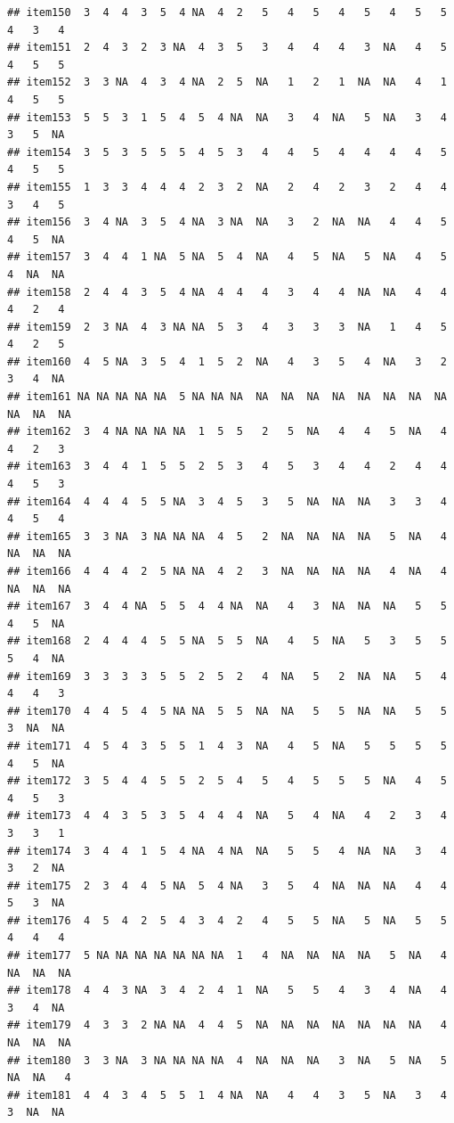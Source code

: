 \documentclass[
  man]{apa6}
\begin{document}
\begin{verbatim}
## item150  3  4  4  3  5  4 NA  4  2   5   4   5   4   5   4   5   5   4   3   4
## item151  2  4  3  2  3 NA  4  3  5   3   4   4   4   3  NA   4   5   4   5   5
## item152  3  3 NA  4  3  4 NA  2  5  NA   1   2   1  NA  NA   4   1   4   5   5
## item153  5  5  3  1  5  4  5  4 NA  NA   3   4  NA   5  NA   3   4   3   5  NA
## item154  3  5  3  5  5  5  4  5  3   4   4   5   4   4   4   4   5   4   5   5
## item155  1  3  3  4  4  4  2  3  2  NA   2   4   2   3   2   4   4   3   4   5
## item156  3  4 NA  3  5  4 NA  3 NA  NA   3   2  NA  NA   4   4   5   4   5  NA
## item157  3  4  4  1 NA  5 NA  5  4  NA   4   5  NA   5  NA   4   5   4  NA  NA
## item158  2  4  4  3  5  4 NA  4  4   4   3   4   4  NA  NA   4   4   4   2   4
## item159  2  3 NA  4  3 NA NA  5  3   4   3   3   3  NA   1   4   5   4   2   5
## item160  4  5 NA  3  5  4  1  5  2  NA   4   3   5   4  NA   3   2   3   4  NA
## item161 NA NA NA NA NA  5 NA NA NA  NA  NA  NA  NA  NA  NA  NA  NA  NA  NA  NA
## item162  3  4 NA NA NA NA  1  5  5   2   5  NA   4   4   5  NA   4   4   2   3
## item163  3  4  4  1  5  5  2  5  3   4   5   3   4   4   2   4   4   4   5   3
## item164  4  4  4  5  5 NA  3  4  5   3   5  NA  NA  NA   3   3   4   4   5   4
## item165  3  3 NA  3 NA NA NA  4  5   2  NA  NA  NA  NA   5  NA   4  NA  NA  NA
## item166  4  4  4  2  5 NA NA  4  2   3  NA  NA  NA  NA   4  NA   4  NA  NA  NA
## item167  3  4  4 NA  5  5  4  4 NA  NA   4   3  NA  NA  NA   5   5   4   5  NA
## item168  2  4  4  4  5  5 NA  5  5  NA   4   5  NA   5   3   5   5   5   4  NA
## item169  3  3  3  3  5  5  2  5  2   4  NA   5   2  NA  NA   5   4   4   4   3
## item170  4  4  5  4  5 NA NA  5  5  NA  NA   5   5  NA  NA   5   5   3  NA  NA
## item171  4  5  4  3  5  5  1  4  3  NA   4   5  NA   5   5   5   5   4   5  NA
## item172  3  5  4  4  5  5  2  5  4   5   4   5   5   5  NA   4   5   4   5   3
## item173  4  4  3  5  3  5  4  4  4  NA   5   4  NA   4   2   3   4   3   3   1
## item174  3  4  4  1  5  4 NA  4 NA  NA   5   5   4  NA  NA   3   4   3   2  NA
## item175  2  3  4  4  5 NA  5  4 NA   3   5   4  NA  NA  NA   4   4   5   3  NA
## item176  4  5  4  2  5  4  3  4  2   4   5   5  NA   5  NA   5   5   4   4   4
## item177  5 NA NA NA NA NA NA NA  1   4  NA  NA  NA  NA   5  NA   4  NA  NA  NA
## item178  4  4  3 NA  3  4  2  4  1  NA   5   5   4   3   4  NA   4   3   4  NA
## item179  4  3  3  2 NA NA  4  4  5  NA  NA  NA  NA  NA  NA  NA   4  NA  NA  NA
## item180  3  3 NA  3 NA NA NA NA  4  NA  NA  NA   3  NA   5  NA   5  NA  NA   4
## item181  4  4  3  4  5  5  1  4 NA  NA   4   4   3   5  NA   3   4   3  NA  NA

\end{verbatim}
\end{document}
